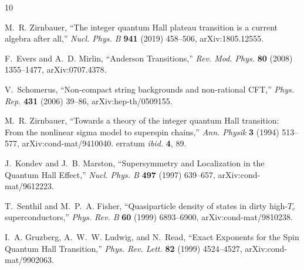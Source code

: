 \documentclass[12pt]{article}
\numberwithin{equation}{section}
\begin{document}
	\providecommand{\href}[2]{#2}\begingroup\raggedright\begin{thebibliography}{10}
		
		M.~R. Zirnbauer, ``{The integer quantum Hall plateau transition is a current
			algebra after all},''
		\href{http://dx.doi.org/10.1016/j.nuclphysb.2019.02.017}{{\em Nucl. Phys. B}
			{\bfseries 941} (2019) 458--506},
		\href{http://arxiv.org/abs/1805.12555}{{\ttfamily arXiv:1805.12555}}.
		
		F.~Evers and A.~D. Mirlin, ``{A}nderson {T}ransitions,''
		\href{http://dx.doi.org/10.1103/revmodphys.80.1355}{{\em Rev. Mod. Phys.}
			{\bfseries 80} (2008) 1355--1477},
		\href{http://arxiv.org/abs/0707.4378}{{\ttfamily arXiv:0707.4378}}.
		
		V.~Schomerus, ``Non-compact string backgrounds and non-rational {CFT},''
		\href{http://dx.doi.org/10.1016/j.physrep.2006.05.001}{{\em Phys. Rep.}
			{\bfseries 431} (2006) 39--86},
		\href{http://arxiv.org/abs/hep-th/0509155}{{\ttfamily arXiv:hep-th/0509155}}.
		
		M.~R. Zirnbauer, ``{T}owards a theory of the integer quantum {Hall} transition:
		{F}rom the nonlinear sigma model to superspin chains,''
		\href{http://dx.doi.org/10.1002/andp.19945060702}{{\em Ann. Physik}
			{\bfseries 3} (1994) 513--577},
		\href{http://arxiv.org/abs/cond-mat/9410040}{{\ttfamily
				arXiv:cond-mat/9410040}}. erratum \emph{ibid.} \textbf{4}, 89.
		
		J.~Kondev and J.~B. Marston, ``{S}upersymmetry and {L}ocalization in the
		{Q}uantum {H}all {E}ffect,''
		\href{http://dx.doi.org/https://doi.org/10.1016/S0550-3213(97)00300-3}{{\em
				Nucl. Phys. B} {\bfseries 497} (1997) 639--657},
		\href{http://arxiv.org/abs/cond-mat/9612223}{{\ttfamily
				arXiv:cond-mat/9612223}}.
		
		T.~Senthil and M.~P.~A. Fisher, ``{Q}uasiparticle density of states in dirty
		high-${T_c}$ superconductors,''
		\href{http://dx.doi.org/10.1103/PhysRevB.60.6893}{{\em Phys. Rev. B}
			{\bfseries 60} (1999) 6893--6900},
		\href{http://arxiv.org/abs/cond-mat/9810238}{{\ttfamily
				arXiv:cond-mat/9810238}}.
		
		I.~A. Gruzberg, A.~W.~W. Ludwig, and N.~Read, ``{E}xact {E}xponents for the
		{S}pin {Q}uantum {H}all {T}ransition,''
		\href{http://dx.doi.org/10.1103/PhysRevLett.82.4524}{{\em Phys. Rev. Lett.}
			{\bfseries 82} (1999) 4524--4527},
		\href{http://arxiv.org/abs/cond-mat/9902063}{{\ttfamily
				arXiv:cond-mat/9902063}}.
		

\end{thebibliography}
\end{document}
